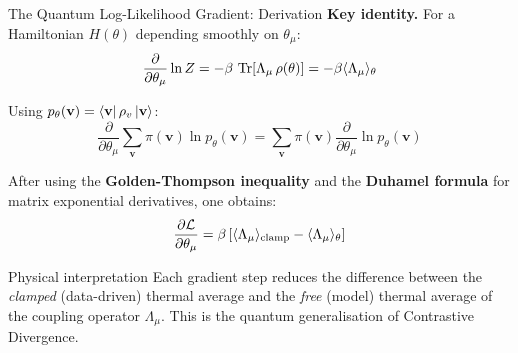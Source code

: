 \documentclass[aspectratio=169,10pt]{beamer}
\begin{document}
\begin{frame}{The Quantum Log-Likelihood Gradient: Derivation}
  \textbf{Key identity.} For a Hamiltonian $H(\theta)$ depending
  smoothly on $\theta_\mu$:
  \[
    \frac{\partial}{\partial\theta_\mu}\ln Z
    = -\beta\,\Tr\!\left[\Lambda_\mu\,\rho(\theta)\right]
    = -\beta\langle\Lambda_\mu\rangle_\theta
  \]

  Using $p_\theta(\mathbf{v}) = \bra{\mathbf{v}}\rho_v\ket{\mathbf{v}}$:
  \[
    \frac{\partial}{\partial\theta_\mu}
    \sum_\mathbf{v}\pi(\mathbf{v})\ln p_\theta(\mathbf{v})
    = \sum_\mathbf{v}\pi(\mathbf{v})
      \frac{\partial}{\partial\theta_\mu}\ln p_\theta(\mathbf{v})
  \]

  After using the \textbf{Golden-Thompson inequality} and the
  \textbf{Duhamel formula} for matrix exponential derivatives,
  one obtains:
  \[
    \frac{\partial \mathcal{L}}{\partial\theta_\mu}
    = \beta\left[
        \langle\Lambda_\mu\rangle_{\rm clamp}
        - \langle\Lambda_\mu\rangle_\theta
      \right]
  \]

  \begin{alertblock}{Physical interpretation}
    Each gradient step reduces the difference between the
    \emph{clamped} (data-driven) thermal average and the
    \emph{free} (model) thermal average of the coupling operator
    $\Lambda_\mu$.  This is the quantum generalisation of
    Contrastive Divergence.
  \end{alertblock}
\end{frame}
\end{document}
